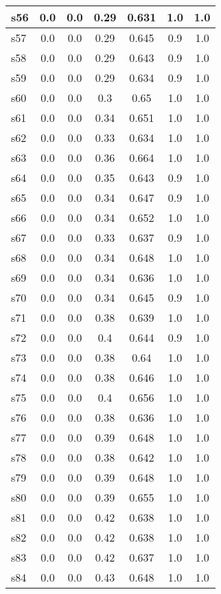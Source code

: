 \documentclass{article}
\begin{document}
\begin{tabular}{|l|c|c|c|c|c|c|}
\hline
s56 &0.0 & 0.0 & 0.29 & 0.631 & 1.0 & 1.0\\
\hline
s57 &0.0 & 0.0 & 0.29 & 0.645 & 0.9 & 1.0\\
\hline
s58 &0.0 & 0.0 & 0.29 & 0.643 & 0.9 & 1.0\\
\hline
s59 &0.0 & 0.0 & 0.29 & 0.634 & 0.9 & 1.0\\
\hline
s60 &0.0 & 0.0 & 0.3 & 0.65 & 1.0 & 1.0\\
\hline
s61 &0.0 & 0.0 & 0.34 & 0.651 & 1.0 & 1.0\\
\hline
s62 &0.0 & 0.0 & 0.33 & 0.634 & 1.0 & 1.0\\
\hline
s63 &0.0 & 0.0 & 0.36 & 0.664 & 1.0 & 1.0\\
\hline
s64 &0.0 & 0.0 & 0.35 & 0.643 & 0.9 & 1.0\\
\hline
s65 &0.0 & 0.0 & 0.34 & 0.647 & 0.9 & 1.0\\
\hline
s66 &0.0 & 0.0 & 0.34 & 0.652 & 1.0 & 1.0\\
\hline
s67 &0.0 & 0.0 & 0.33 & 0.637 & 0.9 & 1.0\\
\hline
s68 &0.0 & 0.0 & 0.34 & 0.648 & 1.0 & 1.0\\
\hline
s69 &0.0 & 0.0 & 0.34 & 0.636 & 1.0 & 1.0\\
\hline
s70 &0.0 & 0.0 & 0.34 & 0.645 & 0.9 & 1.0\\
\hline
s71 &0.0 & 0.0 & 0.38 & 0.639 & 1.0 & 1.0\\
\hline
s72 &0.0 & 0.0 & 0.4 & 0.644 & 0.9 & 1.0\\
\hline
s73 &0.0 & 0.0 & 0.38 & 0.64 & 1.0 & 1.0\\
\hline
s74 &0.0 & 0.0 & 0.38 & 0.646 & 1.0 & 1.0\\
\hline
s75 &0.0 & 0.0 & 0.4 & 0.656 & 1.0 & 1.0\\
\hline
s76 &0.0 & 0.0 & 0.38 & 0.636 & 1.0 & 1.0\\
\hline
s77 &0.0 & 0.0 & 0.39 & 0.648 & 1.0 & 1.0\\
\hline
s78 &0.0 & 0.0 & 0.38 & 0.642 & 1.0 & 1.0\\
\hline
s79 &0.0 & 0.0 & 0.39 & 0.648 & 1.0 & 1.0\\
\hline
s80 &0.0 & 0.0 & 0.39 & 0.655 & 1.0 & 1.0\\
\hline
s81 &0.0 & 0.0 & 0.42 & 0.638 & 1.0 & 1.0\\
\hline
s82 &0.0 & 0.0 & 0.42 & 0.638 & 1.0 & 1.0\\
\hline
s83 &0.0 & 0.0 & 0.42 & 0.637 & 1.0 & 1.0\\
\hline
s84 &0.0 & 0.0 & 0.43 & 0.648 & 1.0 & 1.0\\

\end{tabular}
\end{document}
